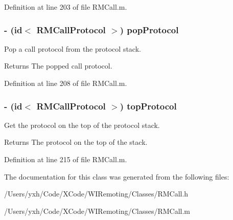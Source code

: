 Definition at line 203 of file RMCall.m.\hypertarget{interface_r_m_call_a2f55cbd7d34e98e4dbc74e1d8d8facf8}{
\subsubsection[{popProtocol}]{\setlength{\rightskip}{0pt plus 5cm}-\/ (id$<$ {\bf RMCallProtocol} $>$) popProtocol }}
\label{interface_r_m_call_a2f55cbd7d34e98e4dbc74e1d8d8facf8}


Pop a call protocol from the protocol stack. \begin{DoxyReturn}{Returns}
The popped call protocol. 
\end{DoxyReturn}


Definition at line 208 of file RMCall.m.\hypertarget{interface_r_m_call_a306021de3467cc71a876068cbed9d834}{
\subsubsection[{topProtocol}]{\setlength{\rightskip}{0pt plus 5cm}-\/ (id$<$ {\bf RMCallProtocol} $>$) topProtocol }}
\label{interface_r_m_call_a306021de3467cc71a876068cbed9d834}


Get the protocol on the top of the protocol stack. \begin{DoxyReturn}{Returns}
The protocol on the top of the stack. 
\end{DoxyReturn}


Definition at line 215 of file RMCall.m.

The documentation for this class was generated from the following files:\begin{DoxyCompactItemize}
\item 
/Users/yxh/Code/XCode/WIRemoting/Classes/RMCall.h\item 
/Users/yxh/Code/XCode/WIRemoting/Classes/RMCall.m\end{DoxyCompactItemize}
